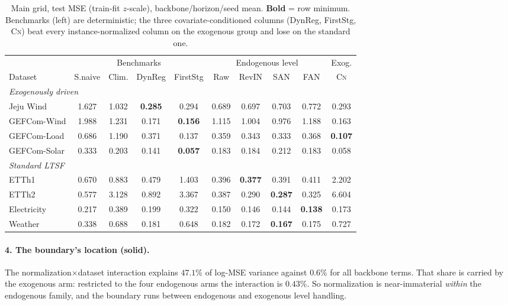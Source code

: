 \documentclass{article}
\newcommand{\cnm}{\textsc{Cn}}
\newcommand{\good}{\textcolor{green!55!black}{\textbf{solid}}}
\begin{document}
\begin{table}[h]
\centering\small
\setlength{\tabcolsep}{3.5pt}
\caption{Main grid, test MSE (train-fit $z$-scale), backbone/horizon/seed mean.
\textbf{Bold} = row minimum. Benchmarks (left) are deterministic; the three
covariate-conditioned columns (DynReg, FirstStg, \cnm) beat every
instance-normalized column on the exogenous group and lose on the standard one.}
\label{tab:main}
\begin{tabular}{lcccc cccc c}
\toprule
& \multicolumn{4}{c}{Benchmarks} & \multicolumn{4}{c}{Endogenous level} & Exog. \\
\cmidrule(lr){2-5}\cmidrule(lr){6-9}\cmidrule(lr){10-10}
Dataset & S.naive & Clim. & DynReg & FirstStg & Raw & RevIN & SAN & FAN & \cnm \\
\midrule
\multicolumn{10}{l}{\emph{Exogenously driven}}\\
Jeju Wind & 1.627 & 1.032 & \textbf{0.285} & 0.294 & 0.689 & 0.697 & 0.703 & 0.772 & 0.293 \\
GEFCom-Wind & 1.988 & 1.231 & 0.171 & \textbf{0.156} & 1.115 & 1.004 & 0.976 & 1.188 & 0.163 \\
GEFCom-Load & 0.686 & 1.190 & 0.371 & 0.137 & 0.359 & 0.343 & 0.333 & 0.368 & \textbf{0.107} \\
GEFCom-Solar & 0.333 & 0.203 & 0.141 & \textbf{0.057} & 0.183 & 0.184 & 0.212 & 0.183 & 0.058 \\
\midrule
\multicolumn{10}{l}{\emph{Standard LTSF}}\\
ETTh1 & 0.670 & 0.883 & 0.479 & 1.403 & 0.396 & \textbf{0.377} & 0.391 & 0.411 & 2.202 \\
ETTh2 & 0.577 & 3.128 & 0.892 & 3.367 & 0.387 & 0.290 & \textbf{0.287} & 0.325 & 6.604 \\
Electricity & 0.217 & 0.389 & 0.199 & 0.322 & 0.150 & 0.146 & 0.144 & \textbf{0.138} & 0.173 \\
Weather & 0.338 & 0.688 & 0.181 & 0.648 & 0.182 & 0.172 & \textbf{0.167} & 0.175 & 0.727 \\
\bottomrule
\end{tabular}
\end{table}

\paragraph{4. The boundary's location (\good).}
The normalization$\times$dataset interaction explains $47.1\%$ of log-MSE
variance against $0.6\%$ for all backbone terms. That share is carried by the
exogenous arm: restricted to the four endogenous arms the interaction is
$0.43\%$. So normalization is near-immaterial \emph{within} the endogenous
family, and the boundary runs between endogenous and exogenous level handling.
\end{document}
